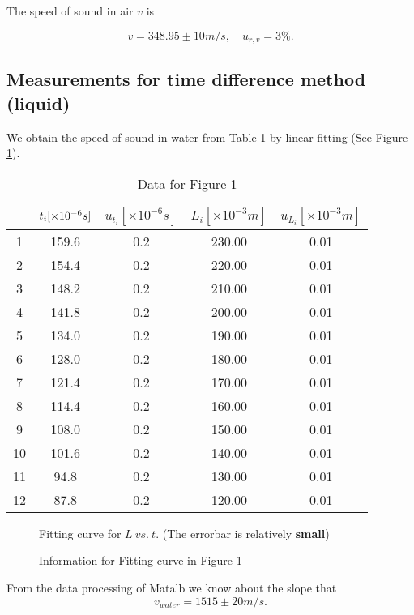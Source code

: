 The speed of sound in air $v$ is

\[
v=348.95\pm10 m/s,\quad u_{r,v}=3\%.
\]

\subsection{Measurements for time difference method (liquid)}

We obtain the speed of sound in water from Table \ref{data_tim} by linear fitting (See Figure \ref{lt}).
    
\begin{table}[H] \small
    \centering
    \begin{tabular}{|c|c|c|c|c|}
    \hline
        & $t_i[\times 10^{-6}s]$ & $u_{t_i}[\times 10^{-6} s]$ & $L_i[\times 10^{-3} m]$ & $u_{L_i}[\times 10^{-3} m]$\\\hline
        1 & 159.6 & 0.2 & 230.00 & 0.01\\\hline
        2 & 154.4 & 0.2 & 220.00 & 0.01\\\hline
        3 & 148.2 & 0.2 & 210.00 & 0.01\\\hline
        4 & 141.8 & 0.2 & 200.00 & 0.01\\\hline
        5 & 134.0 & 0.2 & 190.00 & 0.01\\\hline
        6 & 128.0 & 0.2 & 180.00 & 0.01\\\hline
        7 & 121.4 & 0.2 & 170.00 & 0.01\\\hline
        8 & 114.4 & 0.2 & 160.00 & 0.01\\\hline
        9 & 108.0 & 0.2 & 150.00 & 0.01\\\hline
        10 & 101.6 & 0.2 & 140.00 & 0.01\\\hline
        11 & 94.8 & 0.2 & 130.00 & 0.01\\\hline
        12 & 87.8 & 0.2 & 120.00 & 0.01\\\hline
    \end{tabular}
    \caption{Data for Figure \ref{lt}}\label{data_tim}
\end{table}
\begin{figure}[H]
    \centering
    \caption{Fitting curve for $L\ vs.\ t$. (The errorbar is relatively \textbf{small})}\label{lt}
\end{figure}
\begin{figure}[H]
    \centering
    \caption{Information for Fitting curve in Figure \ref{lt}}\label{ltinfo}
\end{figure}

From the data processing of Matalb we know about the slope that 
\[
    v_{water}=1515\pm20m/s.
\]